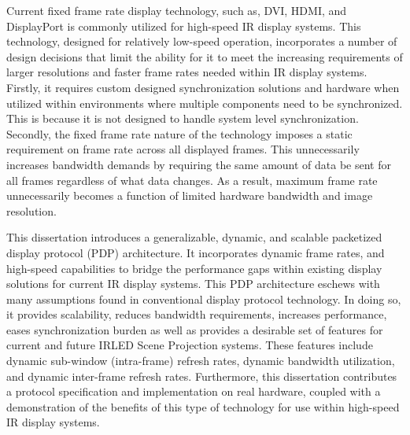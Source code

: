 Current fixed frame rate display technology, such as, DVI, HDMI, and DisplayPort is commonly utilized for high-speed IR display systems. This technology, designed for relatively low-speed operation, incorporates a number of design decisions that limit the ability for it to meet the increasing requirements of larger resolutions and faster frame rates needed within IR display systems. Firstly, it requires custom designed synchronization solutions and hardware when utilized within environments where multiple components need to be synchronized. This is because it is not designed to handle system level synchronization. Secondly, the fixed frame rate nature of the technology imposes a static requirement on frame rate across all displayed frames. This unnecessarily increases bandwidth demands by requiring the same amount of data be sent for all frames regardless of what data changes. As a result, maximum frame rate unnecessarily becomes a function of limited hardware bandwidth and image resolution.

This dissertation introduces a generalizable, dynamic, and scalable packetized display protocol (PDP) architecture. It incorporates dynamic frame rates, and high-speed capabilities to bridge the performance gaps within existing display solutions for current IR display systems. This PDP architecture eschews with many assumptions found in conventional display protocol technology. In doing so, it provides scalability, reduces bandwidth requirements, increases performance, eases synchronization burden as well as provides a desirable set of features for current and future IRLED Scene Projection systems. These features include dynamic sub-window (intra-frame) refresh rates, dynamic bandwidth utilization, and dynamic inter-frame refresh rates. Furthermore, this dissertation contributes a protocol specification and implementation on real hardware, coupled with a demonstration of the benefits of this type of technology for use within high-speed IR display systems.
